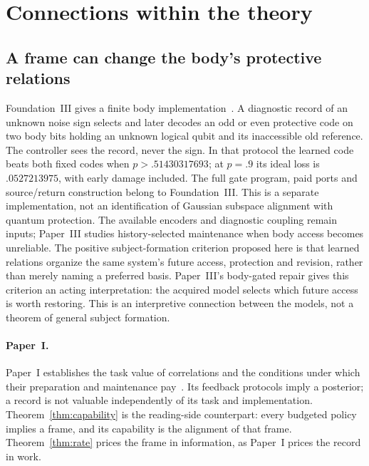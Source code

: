 \documentclass[12pt]{article}
\theoremstyle{definition}
\begin{document}
\section{Connections within the theory}
\label{sec:series}

\subsection{A frame can change the body's protective relations}

Foundation~III gives a finite body implementation~\cite{Liu2026FIII}.
A diagnostic record of an unknown noise sign selects and later decodes
an odd or even protective code on two body bits holding an unknown
logical qubit and its inaccessible old reference. The controller sees
the record, never the sign. In that protocol the learned code beats
both fixed codes when $p>.51430317693$; at $p=.9$ its ideal loss is
$.0527213975$, with early damage included. The full gate program,
paid ports and source/return construction belong to Foundation~III.
This is a separate implementation, not an identification of Gaussian
subspace alignment with quantum protection. The available encoders and
diagnostic coupling remain inputs; Paper~III studies history-selected
maintenance when body access becomes unreliable. The positive
subject-formation criterion proposed here is that learned relations
organize the same system's future access, protection and revision,
rather than merely naming a preferred basis. Paper~III's body-gated
repair gives this criterion an acting interpretation: the acquired
model selects which future access is worth restoring. This is an
interpretive connection between the models, not a theorem of general
subject formation.

\paragraph{Paper~I.} Paper~I establishes the task value of correlations and the conditions under which their preparation and maintenance pay~\cite{Liu2026TDOME_I}. Its feedback protocols imply a posterior; a record is not valuable independently of its task and implementation. Theorem~\ref{thm:capability} is the reading-side counterpart: every budgeted policy implies a frame, and its capability is the alignment of that frame. Theorem~\ref{thm:rate} prices the frame in information, as Paper~I prices the record in work.
\end{document}

